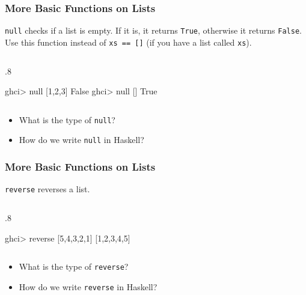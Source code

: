 \documentclass{beamer}
\newenvironment{codeblock}[1][.8]{%
\begin{columns}
\begin{column}{#1\linewidth}
\begin{exampleblock}{}}{%
\end{exampleblock}
\end{column}
\end{columns}}
\begin{document}
\begin{frame}[fragile]
\frametitle{More Basic Functions on Lists}


\verb+null+ checks if a list is empty. If it is, it returns \verb+True+, otherwise it returns \verb+False+. Use this function instead of \verb+xs == []+ (if you have a list called \verb+xs+).

\begin{codeblock}
\begin{hcode}
ghci> null [1,2,3]  
False  
ghci> null []  
True
\end{hcode}
\end{codeblock}

\begin{itemize}

\item What is the type of \verb+null+?

\item How do we write \verb+null+ in Haskell?

\end{itemize}

\end{frame}


\begin{frame}[fragile]
\frametitle{More Basic Functions on Lists}

\verb+reverse+ reverses a list.

\begin{codeblock}
\begin{hcode}
ghci> reverse [5,4,3,2,1]  
[1,2,3,4,5] 
\end{hcode}
\end{codeblock}

\begin{itemize}

\item What is the type of \verb+reverse+?

\item How do we write \verb+reverse+ in Haskell?

\end{itemize}

\end{frame}

\end{document}
